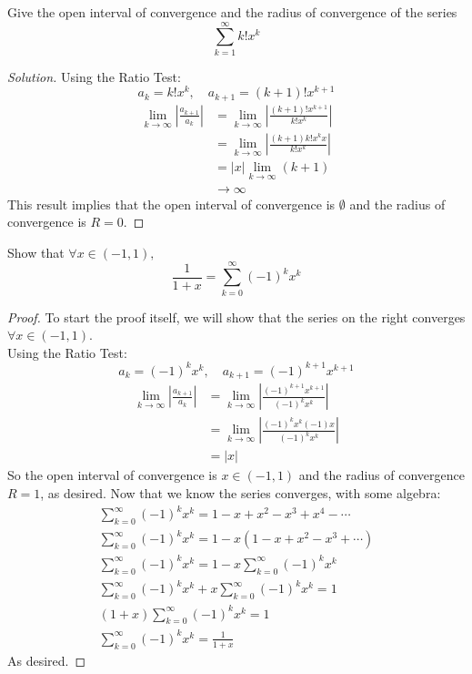 \documentclass{article}
\newcommand{\abs}[1]{\left|#1\right|}
\newcommand{\parens}[1]{\left(#1\right)}
\begin{document}
	\item Give the open interval of convergence and the radius of convergence of the series
	$$\sum_{k=1}^\infty k!x^k$$
	\begin{proof}[Solution]
	Using the Ratio Test:
	$$a_{k} = k!x^k, \quad a_{k+1} = (k+1)!x^{k+1}$$
	\begin{align*}
	\lim_{k\to\infty} \abs{\frac{a_{k+1}}{a_k}} &= \lim_{k\to\infty}\abs{\frac{(k+1)!x^{k+1}}{k!x^k}}\\
	&= \lim_{k\to\infty}\abs{\frac{(k+1)k!x^kx}{k!x^k}}\\
	&= \abs{x}\lim_{k\to\infty}\parens{k+1}\\
	&\to \infty
	\end{align*}
	This result implies that the open interval of convergence is $\emptyset$ and the radius of convergence is $R = 0$.
	\end{proof}
	
	\item Show that $\forall x \in (-1,1),$ 
	$$\frac{1}{1+x} = \sum_{k=0}^\infty (-1)^k x^k$$
	\begin{proof}
	To start the proof itself, we will show that the series on the right converges $\forall x \in (-1,1)$.\\
	Using the Ratio Test:
	$$a_k = (-1)^kx^k, \quad a_{k+1} = (-1)^{k+1}x^{k+1}$$
	\begin{align*}
	\lim_{k\to\infty}\abs{\frac{a_{k+1}}{a_k}} &= \lim_{k\to\infty} \abs{\frac{(-1)^{k+1}x^{k+1}}{(-1)^kx^k}}\\
	&= \lim_{k\to\infty} \abs{\frac{(-1)^{k}x^{k}(-1)x}{(-1)^kx^k}}\\
	&= \abs{x}
	\end{align*}
	So the open interval of convergence is $x \in (-1, 1)$ and the radius of convergence $R = 1$, as desired. Now that we know the series converges, with some algebra:
	\begin{align*}
	\sum_{k=0}^\infty (-1)^k x^k = 1 - x + x^2 - x^3 + x^4 - \cdots\\
	\sum_{k=0}^\infty (-1)^k x^k = 1 - x\parens{1 - x + x^2 - x^3 +\cdots}\\
	\sum_{k=0}^\infty (-1)^k x^k = 1 - x\sum_{k=0}^\infty (-1)^k x^k\\
	\sum_{k=0}^\infty (-1)^k x^k + x\sum_{k=0}^\infty (-1)^k x^k = 1 \\
	\parens{1+x}\sum_{k=0}^\infty (-1)^k x^k = 1\\
	\sum_{k=0}^\infty (-1)^k x^k = \frac{1}{1+x}
	\end{align*}
	As desired.
	\end{proof}
	
\end{document}
